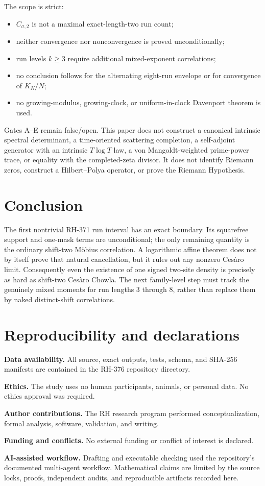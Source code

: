 \documentclass[11pt]{article}
\theoremstyle{definition}
\theoremstyle{remark}
\begin{document}
The scope is strict:
\begin{itemize}[leftmargin=*]
\item $C_{\sigma,2}$ is not a maximal exact-length-two run count;
\item neither convergence nor nonconvergence is proved unconditionally;
\item run levels $k\ge3$ require additional mixed-exponent correlations;
\item no conclusion follows for the alternating eight-run envelope or for
      convergence of $K_N/N$;
\item no growing-modulus, growing-clock, or uniform-in-clock Davenport
      theorem is used.
\end{itemize}

Gates A--E remain false/open.  This paper does not construct a canonical
intrinsic spectral determinant, a time-oriented scattering completion, a
self-adjoint generator with an intrinsic $T\log T$ law, a von
Mangoldt-weighted prime-power trace, or equality with the completed-zeta
divisor.  It does not identify Riemann zeros, construct a Hilbert--Polya
operator, or prove the Riemann Hypothesis.

\section{Conclusion}

The first nontrivial RH-371 run interval has an exact boundary.  Its
squarefree support and one-mask terms are unconditional; the only remaining
quantity is the ordinary shift-two M\"obius correlation.  A logarithmic
affine theorem does not by itself prove that natural cancellation, but it rules out any
nonzero Ces\`aro limit.  Consequently even the existence of one signed
two-site density is precisely as hard as shift-two Ces\`aro Chowla.  The next
family-level step must track the genuinely mixed moments for run lengths
$3$ through $8$, rather than replace them by naked distinct-shift
correlations.

\section*{Reproducibility and declarations}

\textbf{Data availability.}  All source, exact outputs, tests, schema, and
SHA-256 manifests are contained in the RH-376 repository directory.

\textbf{Ethics.}  The study uses no human participants, animals, or personal
data.  No ethics approval was required.

\textbf{Author contributions.}  The RH research program performed
conceptualization, formal analysis, software, validation, and writing.

\textbf{Funding and conflicts.}  No external funding or conflict of interest
is declared.

\textbf{AI-assisted workflow.}  Drafting and executable checking used the
repository's documented multi-agent workflow.  Mathematical claims are
limited by the source locks, proofs, independent audits, and reproducible
artifacts recorded here.



\end{document}
